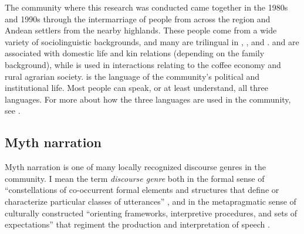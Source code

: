 \documentclass[output=paper]{LSP/langsci}
\begin{document}
The community where this research was conducted came together in the 1980s and 1990s through the intermarriage of  people from across the region and Andean settlers from the nearby highlands. These people come from a wide variety of sociolinguistic backgrounds, and many are trilingual in , , and .  and  are associated with domestic life and kin relations (depending on the family background), while  is used in interactions relating to the coffee economy and rural agrarian society.  is the language of the community’s political and institutional life. Most people can speak, or at least understand, all three languages. For more about how the three languages are used in the community, see \citet{emlen14,emlen.2015, emlen.2017}.
 
\subsection{Myth narration}
\label{Emmyth-narr}
Myth narration is one of many locally recognized discourse genres in the community. I mean the term \textit{discourse genre} both in the formal sense of ``constellations of co-occurrent formal elements and structures that define or characterize particular classes of utterances''  \citep[][141]{briggs.1992}, and in the metapragmatic sense of culturally constructed ``orienting frameworks, interpretive procedures, and sets of expectations'' \citep[][670]{hanks.1987} that regiment the production and interpretation of speech  \citep[see also][]{bakhtin86,silverstein93}.  
\end{document}
